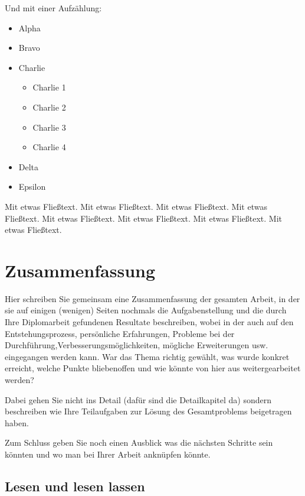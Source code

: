 \documentclass[
    headings=optiontotocandhead,%
    twoside,
    numbers=noenddot,%
    12pt, %
    titlepage, %
    parskip=full, %
    listof=leveldown, 
    numbers=noenddot, %
    a4paper,DIV=14,
    BCOR=15mm,
]{scrbook}
\makeatletter
\newcommand*{\the@orig@section}{}
\let\the@orig@section\section
\renewcommand*{\section}{%
  \clearpage
  \the@orig@section
}
\providecommand{\tightlist}{%
  \setlength{\itemsep}{0pt}\setlength{\parskip}{0pt}}
\makeatother
\begin{document}
Und mit einer Aufzählung:

\begin{itemize}
\tightlist
\item
  Alpha
\item
  Bravo
\item
  Charlie

  \begin{itemize}
  \tightlist
  \item
    Charlie 1
  \item
    Charlie 2
  \item
    Charlie 3
  \item
    Charlie 4
  \end{itemize}
\item
  Delta
\item
  Epsilon
\end{itemize}

Mit etwas Fließtext. Mit etwas Fließtext. Mit etwas Fließtext. Mit etwas
Fließtext. Mit etwas Fließtext. Mit etwas Fließtext. Mit etwas
Fließtext. Mit etwas Fließtext.

\hypertarget{zusammenfassung}{%
\section{Zusammenfassung}\label{zusammenfassung}}

Hier schreiben Sie gemeinsam eine Zusammenfassung der gesamten Arbeit,
in der sie auf einigen (wenigen) Seiten nochmals die Aufgabenstellung
und die durch Ihre Diplomarbeit gefundenen Resultate beschreiben, wobei
in der auch auf den Entstehungsprozess, persönliche Erfahrungen,
Probleme bei der Durchführung,Verbesserungsmöglichkeiten, mögliche
Erweiterungen usw. eingegangen werden kann. War das Thema richtig
gewählt, was wurde konkret erreicht, welche Punkte bliebenoffen und wie
könnte von hier aus weitergearbeitet werden?

Dabei gehen Sie nicht ins Detail (dafür sind die Detailkapitel da)
sondern beschreiben wie Ihre Teilaufgaben zur Lösung des Gesamtproblems
beigetragen haben.

Zum Schluss geben Sie noch einen Ausblick was die nächsten Schritte sein
könnten und wo man bei Ihrer Arbeit anknüpfen könnte.

\hypertarget{lesen-und-lesen-lassen}{%
\subsection{Lesen und lesen lassen}\label{lesen-und-lesen-lassen}}
\end{document}
